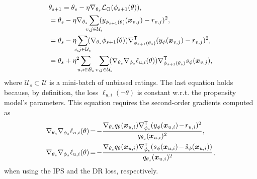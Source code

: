 \documentclass[letterpaper]{article} %
\newcommand{\transpose}{\mathsf{T}}
\newcommand{\vectorize}[1]{\bm{#1}}
\newcommand{\lrdense}[2]{\smashoperator[lr]{#1_{#2}}}
\newcommand{\ldense}[2]{\smashoperator[l]{#1_{#2}}}
\newcommand{\rdense}[2]{\smashoperator[r]{#1_{#2}}}
\newcommand{\obsBiasedPairs}{\mathcal{B}}
\newcommand{\obsUnbiasedPairs}{\mathcal{U}}
\newcommand{\biasedRating}{r_{u,i}}
\newcommand{\unbiasedRating}{r_{v,j}}
\newcommand{\featureMark}{x}
\newcommand{\biasedFeatures}{\vectorize{\featureMark}_{u,i}}
\newcommand{\unbiasedFeatures}{\vectorize{\featureMark}_{v,j}}
\newcommand{\loss}[1]{\mathcal{L}_{\rm #1}}
\newcommand{\obsLoss}{\ell}
\newcommand{\misLoss}{\ell}
\newcommand{\outerMark}{O}
\newcommand{\ratingName}{y}
\newcommand{\ratingParam}{\phi}
\newcommand{\ratingModel}{\ratingName_\ratingParam(\biasedFeatures)}
\newcommand{\lossName}{s}
\newcommand{\trueLoss}{\lossName_\ratingParam(\biasedFeatures)}
\newcommand{\imputedLoss}{\hat{\lossName}_\ratingParam(\biasedFeatures)}
\newcommand{\propensityName}{q}
\newcommand{\propensityParam}{\theta}
\newcommand{\propensityModel}{\propensityName_\propensityParam(\biasedFeatures)}
\newcommand{\step}{s}
\newcommand{\learningRate}{\eta}
\begin{document}
\begin{align}
&\propensityParam_{\step+1}
=\propensityParam_\step
-\learningRate\nabla_{\propensityParam_\step}
\loss{\outerMark}(\ratingParam_{\step+1}(\propensityParam)),
\label{eqn:propensity model training}\\
&=\propensityParam_\step
-\learningRate\nabla_{\propensityParam_\step}
\lrdense{\sum}{v,j\in\obsUnbiasedPairs_\step}
(\ratingName_{\ratingParam_{\step+1}(\propensityParam)}(\unbiasedFeatures)-\unbiasedRating)^2,
\nonumber\\
&=\propensityParam_\step
-\learningRate\lrdense{\sum}{v,j\in\obsUnbiasedPairs_\step}
(\nabla_{\propensityParam_\step}\ratingParam_{\step+1}(\propensityParam))
\nabla_{\ratingParam_{\step+1}(\propensityParam_\step)}^\transpose
(\ratingName_{\ratingParam}(\unbiasedFeatures)-\unbiasedRating)^2,
\nonumber\\
&=\propensityParam_\step
+\learningRate^2
\ldense{\sum}{u,i\in\obsBiasedPairs_\step}
\rdense{\sum}{v,j\in\obsUnbiasedPairs_\step}
(\nabla_{\propensityParam_\step}\nabla_{\ratingParam_\step}\obsLoss_{u,i}(\propensityParam))
\nabla_{\ratingParam_{\step+1}(\propensityParam_\step)}^\transpose
\lossName_\ratingParam(\unbiasedFeatures),
\nonumber
\end{align}
where $\obsUnbiasedPairs_\step\subset\obsUnbiasedPairs$ is a mini-batch of unbiased ratings.
The last equation holds because, by definition, the loss $\misLoss_{u,i}(\lnot\propensityParam)$ is constant w.r.t. the propensity model's parameters.
This equation requires the second-order gradients computed as
\begin{equation*}
\thinmuskip=1.5mu
\medmuskip=2.0mu
\thickmuskip=2.5mu
\begin{aligned}
\nabla_{\propensityParam_\step}\nabla_{\ratingParam_\step}
\obsLoss_{u,i}(\propensityParam)
&=-\frac{
  \nabla_{\propensityParam_\step}\propensityModel
  \nabla_{\ratingParam_\step}^\transpose(\ratingModel-\biasedRating)^2
}{\propensityName_{\propensityParam_\step}(\biasedFeatures)^2},\\
\nabla_{\propensityParam_\step}\nabla_{\ratingParam_\step}
\obsLoss_{u,i}(\propensityParam)
&=-\frac{
  \nabla_{\propensityParam_\step}\propensityModel
  \nabla_{\ratingParam_\step}^\transpose(\trueLoss-\imputedLoss)
}{\propensityName_{\propensityParam_\step}(\biasedFeatures)^2},
\end{aligned}
\end{equation*}%
when using the IPS and the DR loss, respectively.
\end{document}

